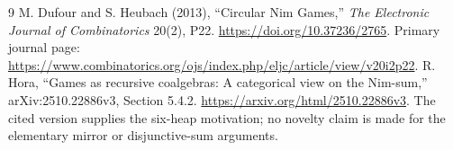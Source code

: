 \documentclass[11pt,a4paper]{article}
\theoremstyle{definition}
\theoremstyle{remark}
\begin{document}
\begin{thebibliography}{9}
 M. Dufour and S. Heubach (2013), ``Circular Nim Games,'' \emph{The Electronic Journal of Combinatorics} 20(2), P22. \url{https://doi.org/10.37236/2765}. Primary journal page: \url{https://www.combinatorics.org/ojs/index.php/eljc/article/view/v20i2p22}.
 R. Hora, ``Games as recursive coalgebras: A categorical view on the Nim-sum,'' arXiv:2510.22886v3, Section 5.4.2. \url{https://arxiv.org/html/2510.22886v3}. The cited version supplies the six-heap motivation; no novelty claim is made for the elementary mirror or disjunctive-sum arguments.
\end{thebibliography}
\end{document}
